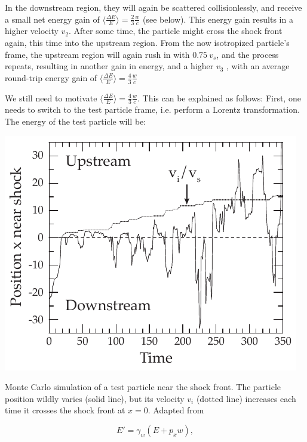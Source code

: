\documentclass[
    a4paper, %
    fontsize=10pt, %
    twoside=false, %
    numbers=noenddot, %
    fontmethod=tex,
]{kaobook}
\begin{document}
In the downstream region, they will again be scattered collisionlessly, and receive a small net energy gain of $\big\langle\frac{\Delta E}{E}\big\rangle = \frac{2}{3}\frac{w}{c}$ (see below). This energy gain results in a higher velocity $v_2$. After some time, the particle might cross the shock front again, this time into the upstream region. From the now isotropized particle's frame, the upstream region will again rush in with $0.75~v_s$, and the process repeats, resulting in another gain in energy, and a higher $v_3$ , with an average round-trip energy gain of $\big\langle\frac{\Delta E}{E}\big\rangle = \frac{4}{3}\frac{w}{c}$

We still need to motivate $\big\langle\frac{\Delta E}{E}\big\rangle = \frac{4}{3}\frac{w}{c}$. This can be explained as follows: First, one needs to switch to the test particle frame, i.e. perform a Lorentz transformation. The energy of the test particle will be:

\begin{marginfigure}
    \includegraphics{theory/dsa_mc.pdf}
    \caption[DSA Monte Carlo]{Monte Carlo simulation of a test particle near the shock front. The particle position wildly varies (solid line), but its velocity $v_i$ (dotted line) increases each time it crosses the shock front at $x=0$. Adapted from \cite{Baring1997}}
\end{marginfigure}

\begin{equation}
    E' = \gamma_{w}(E+p_x w),
\end{equation}
\end{document}
